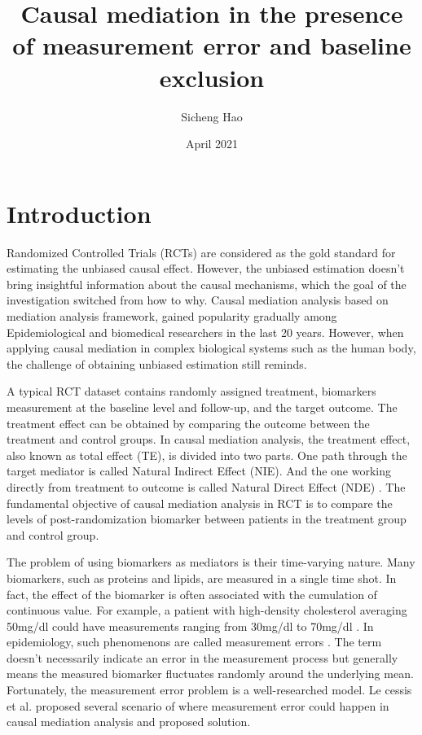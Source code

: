 \documentclass{article}
\title{Causal mediation in the presence of measurement error and baseline exclusion}
\author{Sicheng Hao}
\date{April 2021}
\begin{document}
\maketitle

\section{Introduction}


Randomized Controlled Trials (RCTs) are considered as the gold standard for estimating the unbiased causal effect. However, the unbiased estimation doesn’t  bring insightful information about the causal mechanisms, which the goal of the investigation switched from how to why. Causal mediation analysis based on mediation analysis framework, gained popularity gradually among Epidemiological and biomedical researchers in the last 20 years. However, when applying causal mediation in complex biological systems such as the human body, the challenge of obtaining unbiased estimation still reminds. 

A typical RCT dataset contains randomly assigned treatment, biomarkers measurement at the baseline level and follow-up, and the target outcome.  The treatment effect can be obtained by comparing the outcome between the treatment and control groups. In causal mediation analysis, the treatment effect, also known as total effect (TE), is divided into two parts. One path through the target mediator is called Natural Indirect Effect (NIE). And the one working directly from treatment to outcome is called Natural Direct Effect (NDE) \cite{vanderweele2015explanation}. The fundamental objective of causal mediation analysis in RCT is to compare the levels of post-randomization biomarker between patients in the treatment group and control group. 

The problem of using biomarkers as mediators is their time-varying nature. Many biomarkers, such as proteins and lipids, are measured in a single time shot. In fact, the effect of the biomarker is often associated with the cumulation of continuous value. For example, a patient with high-density cholesterol averaging 50mg/dl could have measurements ranging from 30mg/dl to 70mg/dl \cite{barnett2005regression}. In epidemiology, such phenomenons are called measurement errors \cite{carroll2006measurement}. The term doesn’t necessarily indicate an error in the measurement process but generally means the measured biomarker fluctuates randomly around the underlying mean. Fortunately, the measurement error problem is a well-researched model. Le cessis et al. proposed several scenario of where measurement error could happen in causal mediation analysis and proposed solution\cite{le2012quantification}.
\end{document}

